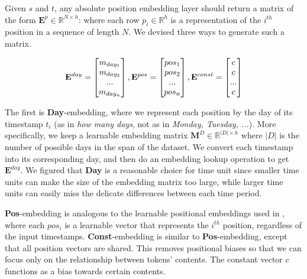 Given $s$ and $t$, any absolute position embedding layer should return a matrix of the form $\mathbf{E}^p \in \mathbb{R}^{N \times h}$: where each row $p_i \in \mathbb{R}^h$ is a representation of the $i^{th}$ position in a sequence of length $N$. We devised three ways to generate such a matrix.

\begin{displaymath}
  \mathbf{E}^{day} = \begin{bmatrix}
                      m_{day_1}\\
                      m_{day_2}\\
                      ...\\
                      m_{day_n}\\
                    \end{bmatrix}
  ,\mathbf{E}^{pos} = \begin{bmatrix}
                       pos_1\\
                       pos_2\\
                       ...\\
                       pos_n\\
                     \end{bmatrix}\\
  , 
  \mathbf{E}^{const} = \begin{bmatrix}
                       c\\
                       c\\
                       ...\\
                       c\\
                       \end{bmatrix}   
\end{displaymath}

The first is \textbf{Day}-embedding, where we represent each position by the day of its timestamp $t_i$ (as in \textit{how many days}, not as in \textit{Monday, Tuesday, ...}). More specifically, we keep a learnable embedding matrix $\mathbf{M}^D \in \mathbb{R}^{|D| \times h}$ where $|D|$ is the number of possible days in the span of the dataset. We convert each timestamp into its corresponding day, and then do an embedding lookup operation to get $\mathbf{E}^{day}$. We figured that \textbf{Day} is a reasonable choice for time unit since smaller time units can make the size of the embedding matrix too large, while larger time units can easily miss the delicate differences between each time period.

\textbf{Pos}-embedding is analogous to the learnable positional embeddings used in \cite{BERT, BERT4Rec}, where each $pos_i$ is a learnable vector that represents the $i^{th}$ position, regardless of the input timestamps. \textbf{Const}-embedding is similar to \textbf{Pos}-embedding, except that all position vectors are shared. This removes positional biases so that we can focus only on the relationship between tokens' contents. The constant vector $c$ functions as a bias towards certain contents.


